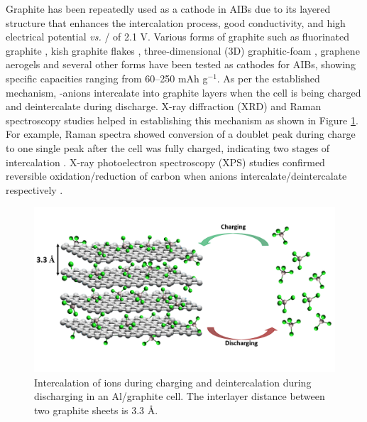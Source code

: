 \documentclass{article}
\begin{document}
Graphite has been repeatedly used as a cathode in AIBs \cite{lin_ultrafast_2015-2, wang_advanced_2017,zhang_novel_2016-1, rani_fluorinated_2013} due to its layered structure that enhances the intercalation process, good conductivity, and high electrical potential {\it vs.} / of 2.1 V. Various forms of graphite such as fluorinated graphite \cite{rani_fluorinated_2013}, kish graphite flakes \cite{wang_kish_2017}, three-dimensional (3D) graphitic-foam \cite{wu_3d_2016}, graphene aerogels \cite{huang_graphene_2019} and several other forms have been tested as cathodes for AIBs, showing specific capacities ranging from 60--250 mAh g$^{-1}$. As per the established mechanism, -anions intercalate into graphite layers when the cell is being charged and deintercalate during discharge. X-ray diffraction (XRD) and Raman spectroscopy studies helped in establishing this mechanism \cite{rani_fluorinated_2013, wang_advanced_2017,lin_ultrafast_2015-2} as shown in Figure \ref{fig:graphitemech}. For example, Raman spectra showed conversion of a doublet peak during charge to one single peak after the cell was fully charged, indicating two stages of intercalation \cite{wang_advanced_2017}. X-ray photoelectron spectroscopy (XPS) studies confirmed reversible oxidation/reduction of carbon when  anions intercalate/deintercalate respectively \cite{stadie_zeolite-templated_2017, liu_binder-free_2019,wei_amorphous_2017}.

\begin{figure}[] %
  \centering
  \includegraphics[width=\textwidth]{fig/graphitemech}
    \caption{Intercalation of  ions during charging and deintercalation during discharging in an Al/graphite cell. The interlayer distance between two graphite sheets is 3.3 \AA.}
  \label{fig:graphitemech}
\end{figure}
\end{document}
